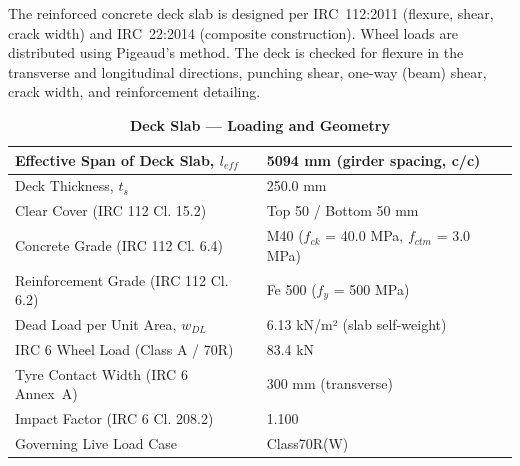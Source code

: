 \documentclass[12pt,a4paper]{report}
\numberwithin{table}{chapter}
\numberwithin{figure}{chapter}
\begin{document}
The reinforced concrete deck slab is designed per IRC~112:2011 (flexure, shear, crack width) and IRC~22:2014 (composite construction). Wheel loads are distributed using Pigeaud's method. The deck is checked for flexure in the transverse and longitudinal directions, punching shear, one-way (beam) shear, crack width, and reinforcement detailing.

\vspace{1em}
\begin{longtable}{|L{5.5cm}|p{10.0cm}|}
\caption{\textbf{Deck Slab --- Loading and Geometry}}\\
\hline
\textnormal{Effective Span of Deck Slab, $l_{eff}$} & 5094 mm (girder spacing, c/c) \\[6pt]
\hline
\textnormal{Deck Thickness, $t_s$} & 250.0 mm \\[6pt]
\hline
\textnormal{Clear Cover (IRC 112 Cl. 15.2)} & Top 50 / Bottom 50 mm \\[6pt]
\hline
\textnormal{Concrete Grade (IRC 112 Cl. 6.4)} & M40 ($f_{ck}$ = 40.0 MPa, $f_{ctm}$ = 3.0 MPa) \\[6pt]
\hline
\textnormal{Reinforcement Grade (IRC 112 Cl. 6.2)} & Fe 500 ($f_y$ = 500 MPa) \\[6pt]
\hline
\textnormal{Dead Load per Unit Area, $w_{DL}$} & 6.13 kN/m² (slab self-weight) \\[6pt]
\hline
\textnormal{IRC 6 Wheel Load (Class A / 70R)} & 83.4 kN \\[6pt]
\hline
\textnormal{Tyre Contact Width (IRC 6 Annex~A)} & 300 mm (transverse) \\[6pt]
\hline
\textnormal{Impact Factor (IRC 6 Cl. 208.2)} & 1.100 \\[6pt]
\hline
\textnormal{Governing Live Load Case} & Class70R(W) \\[6pt]
\hline
\end{longtable}
\end{document}
